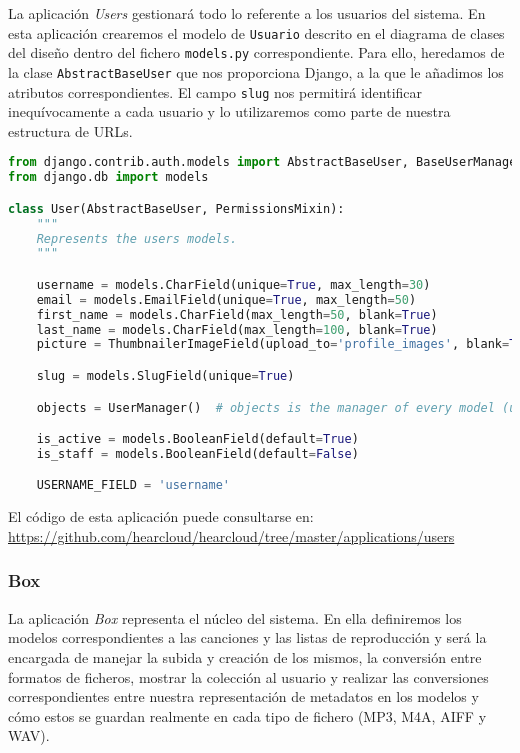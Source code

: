 La aplicación \textit{Users} gestionará todo lo referente a los usuarios del sistema. En esta aplicación crearemos el modelo de \texttt{Usuario} descrito en el diagrama de clases del diseño dentro del fichero \texttt{models.py} correspondiente. Para ello, heredamos de la clase \texttt{AbstractBaseUser} que nos proporciona Django, a la que le añadimos los atributos correspondientes. El campo \texttt{slug} nos permitirá identificar inequívocamente a cada usuario y lo utilizaremos como parte de nuestra estructura de URLs.

\begin{lstlisting}[language=python,caption={Modelo personalizado de usuarios},label={lst:py_usermodel}]
from django.contrib.auth.models import AbstractBaseUser, BaseUserManager, PermissionsMixin
from django.db import models

class User(AbstractBaseUser, PermissionsMixin):
    """
    Represents the users models.
    """

    username = models.CharField(unique=True, max_length=30)
    email = models.EmailField(unique=True, max_length=50)
    first_name = models.CharField(max_length=50, blank=True)
    last_name = models.CharField(max_length=100, blank=True)
    picture = ThumbnailerImageField(upload_to='profile_images', blank=True)

    slug = models.SlugField(unique=True)

    objects = UserManager()  # objects is the manager of every model (users.objects.all(), ...)

    is_active = models.BooleanField(default=True)
    is_staff = models.BooleanField(default=False)

    USERNAME_FIELD = 'username'

\end{lstlisting}

El código de esta aplicación puede consultarse en: \url{https://github.com/hearcloud/hearcloud/tree/master/applications/users}

\subsubsection{Box}

La aplicación \textit{Box} representa el núcleo del sistema. En ella definiremos los modelos correspondientes a las canciones y las listas de reproducción y será la encargada de manejar la subida y creación de los mismos, la conversión entre formatos de ficheros, mostrar la colección al usuario y realizar las conversiones correspondientes entre nuestra representación de metadatos en los modelos y cómo estos se guardan realmente en cada tipo de fichero (MP3, M4A, AIFF y WAV).

